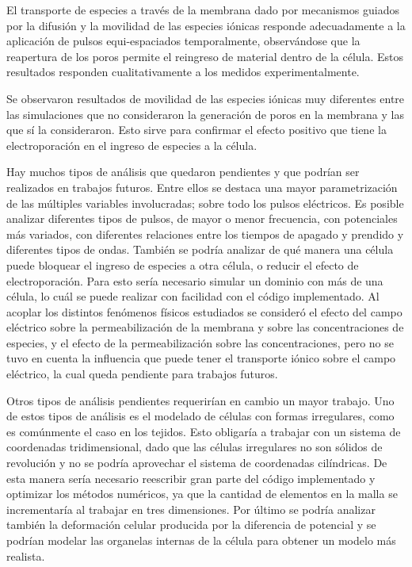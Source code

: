 El transporte de especies a través de la membrana dado por mecanismos guiados por la difusión y la movilidad de las especies iónicas responde adecuadamente a la aplicación de pulsos equi-espaciados temporalmente, observándose que la reapertura de los poros permite el reingreso de material dentro de la célula. Estos resultados responden cualitativamente a los medidos experimentalmente.

Se observaron resultados de movilidad de las especies iónicas muy diferentes entre las simulaciones que no consideraron la generación de poros en la membrana y las que sí la consideraron. Esto sirve para confirmar el efecto positivo que tiene la electroporación en el ingreso de especies a la célula.

Hay muchos tipos de análisis que quedaron pendientes y que podrían ser realizados en trabajos futuros. Entre ellos se destaca una mayor parametrización de las múltiples variables involucradas; sobre todo los pulsos eléctricos. Es posible analizar diferentes tipos de pulsos, de mayor o menor frecuencia, con potenciales más variados, con diferentes relaciones entre los tiempos de apagado y prendido y diferentes tipos de ondas. También se podría analizar de qué manera una célula puede bloquear el ingreso de especies a otra célula, o reducir el efecto de electroporación. Para esto sería necesario simular un dominio con más de una célula, lo cuál se puede realizar con facilidad con el código implementado. Al acoplar los distintos fenómenos físicos estudiados se consideró el efecto del campo eléctrico sobre la permeabilización de la membrana y sobre las concentraciones de especies, y el efecto de la permeabilización sobre las concentraciones, pero no se tuvo en cuenta la influencia que puede tener el transporte iónico sobre el campo eléctrico, la cual queda pendiente para trabajos futuros.

Otros tipos de análisis pendientes requerirían en cambio un mayor trabajo. Uno de estos tipos de análisis es el modelado de células con formas irregulares, como es comúnmente el caso en los tejidos. Esto obligaría a trabajar con un sistema de coordenadas tridimensional, dado que las células irregulares no son sólidos de revolución y no se podría aprovechar el sistema de coordenadas cilíndricas. De esta manera sería necesario reescribir gran parte del código implementado y optimizar los métodos numéricos, ya que la cantidad de elementos en la malla se incrementaría al trabajar en tres dimensiones. Por último se podría analizar también la deformación celular producida por la diferencia de potencial y se podrían modelar las organelas internas de la célula para obtener un modelo más realista.
